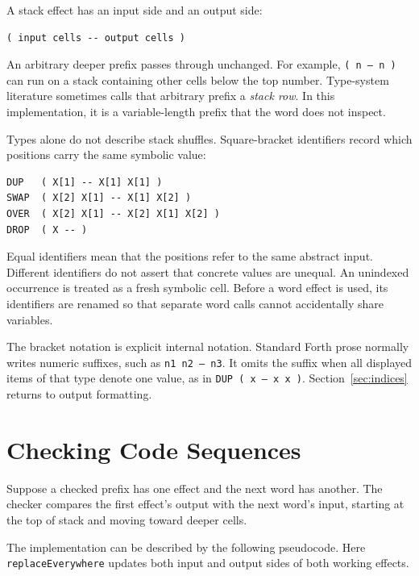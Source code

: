 \documentclass[11pt,a4paper]{article}
\newcommand{\stackeffect}[1]{\mbox{\texttt{#1}}}
\begin{document}
A stack effect has an input side and an output side:

\begin{lstlisting}
( input cells -- output cells )
\end{lstlisting}

An arbitrary deeper prefix passes through unchanged.  For example,
\stackeffect{( n -- n )} can run on a stack containing other cells below the top
number.  Type-system literature sometimes calls that arbitrary prefix a
\emph{stack row}.  In this implementation, it is a variable-length prefix that
the word does not inspect.

Types alone do not describe stack shuffles.  Square-bracket identifiers record
which positions carry the same symbolic value:

\begin{lstlisting}
DUP   ( X[1] -- X[1] X[1] )
SWAP  ( X[2] X[1] -- X[1] X[2] )
OVER  ( X[2] X[1] -- X[2] X[1] X[2] )
DROP  ( X -- )
\end{lstlisting}

Equal identifiers mean that the positions refer to the same abstract input.
Different identifiers do not assert that concrete values are unequal.  An
unindexed occurrence is treated as a fresh symbolic cell.  Before a word
effect is used, its identifiers are renamed so that separate word calls cannot
accidentally share variables.

The bracket notation is explicit internal notation.  Standard Forth prose
normally writes numeric suffixes, such as \stackeffect{n1 n2 -- n3}.  It omits the
suffix when all displayed items of that type denote one value, as in
\stackeffect{DUP ( x -- x x )}.  Section~\ref{sec:indices} returns to output
formatting.

\section{Checking Code Sequences}
\label{sec:sequence}

Suppose a checked prefix has one effect and the next word has another.  The
checker compares the first effect's output with the next word's input, starting
at the top of stack and moving toward deeper cells.

The implementation can be described by the following pseudocode.  Here
\texttt{replaceEverywhere} updates both input and output sides of both working
effects.
\end{document}
